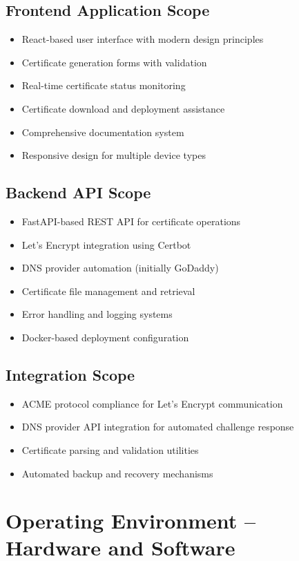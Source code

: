 \subsection{Frontend Application Scope}
\begin{itemize}
    \item React-based user interface with modern design principles
    \item Certificate generation forms with validation
    \item Real-time certificate status monitoring
    \item Certificate download and deployment assistance
    \item Comprehensive documentation system
    \item Responsive design for multiple device types
\end{itemize}

\subsection{Backend API Scope}
\begin{itemize}
    \item FastAPI-based REST API for certificate operations
    \item Let's Encrypt integration using Certbot
    \item DNS provider automation (initially GoDaddy)
    \item Certificate file management and retrieval
    \item Error handling and logging systems
    \item Docker-based deployment configuration
\end{itemize}

\subsection{Integration Scope}
\begin{itemize}
    \item ACME protocol compliance for Let's Encrypt communication
    \item DNS provider API integration for automated challenge response
    \item Certificate parsing and validation utilities
    \item Automated backup and recovery mechanisms
\end{itemize}

\section{Operating Environment – Hardware and Software}

